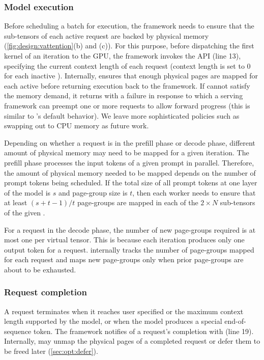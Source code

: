 \subsubsection{Model execution} Before scheduling a batch for execution, the framework needs to ensure that the \kvcache sub-tensors of each active request are backed by physical memory (\autoref{fig:design:vattention}(b) and (c)). For this purpose, before dispatching the first kernel of an iteration to the GPU, the framework invokes the \vattnstep API (line 13), specifying the current context length of each request (context length is set to 0 for each inactive \reqid). Internally, \sysname ensures that enough physical pages are mapped for each active \reqid before returning execution back to the framework. If \sysname cannot satisfy the memory demand, it returns with a failure in response to which a serving framework can preempt one or more requests to allow forward progress (this is similar to \vllm's default behavior). We leave more sophisticated policies such as swapping out \kvcache to CPU memory as future work.



Depending on whether a request is in the prefill phase or decode phase, different amount of physical memory may need to be mapped for a given iteration. The prefill phase processes the input tokens of a given prompt in parallel. Therefore, the amount of physical memory needed to be mapped depends on the number of prompt tokens being scheduled. If the total \kcache size of all prompt tokens at one layer of the model is $s$ and page-group size is $t$, then each worker needs to ensure that at least $(s+t-1)/t$ page-groups are mapped in each of the $2\times N$ \kvcache sub-tensors of the given \reqid. 


For a request in the decode phase, the number of new page-groups required is at most one per virtual tensor. This is because each iteration produces only one output token for a request. \sysname internally tracks the number of page-groups mapped for each request and maps new page-groups only when prior page-groups are about to be exhausted. 


\subsubsection{Request completion} A request terminates when it reaches user specified or the maximum context length supported by the model, or when the model produces a special end-of-sequence token. The framework notifies \sysname  of a request's completion with \vattnfreeid (line 19). Internally, \sysname may unmap the physical pages of a completed request or defer them to be freed later (\autoref{sec:opt:defer}).


